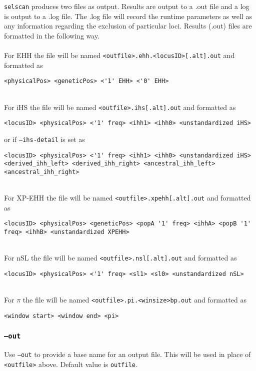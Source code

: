 \documentclass[12pt]{article}%
\begin{document}
{\tt selscan} produces two files as output.  Results are output to a .out file and a log is output to a .log file.  The .log file will record the runtime parameters as well as any information regarding the exclusion of particular loci.  Results (.out) files are formatted in the following way.
~\\~\\
For EHH the file will be named {\tt <outfile>.ehh.<locusID>[.alt].out} and formatted as
\begin{lstlisting}
<physicalPos> <geneticPos> <'1' EHH> <'0' EHH>
\end{lstlisting}
~\\
For iHS the file will be named {\tt <outfile>.ihs[.alt].out} and formatted as
\begin{lstlisting}
<locusID> <physicalPos> <'1' freq> <ihh1> <ihh0> <unstandardized iHS>
\end{lstlisting}
or if {\tt --ihs-detail} is set as
\begin{lstlisting}
<locusID> <physicalPos> <'1' freq> <ihh1> <ihh0> <unstandardized iHS> <derived_ihh_left> <derived_ihh_right> <ancestral_ihh_left> <ancestral_ihh_right>
\end{lstlisting}
~\\
For XP-EHH the file will be named {\tt <outfile>.xpehh[.alt].out} and formatted as
\begin{lstlisting}
<locusID> <physicalPos> <geneticPos> <popA '1' freq> <ihhA> <popB '1' freq> <ihhB> <unstandardized XPEHH>
\end{lstlisting}
~\\
For nSL the file will be named {\tt <outfile>.nsl[.alt].out} and formatted as
\begin{lstlisting}
<locusID> <physicalPos> <'1' freq> <sl1> <sl0> <unstandardized nSL>
\end{lstlisting}
~\\
For $\pi$ the file will be named {\tt <outfile>.pi.<winsize>bp.out} and formatted as
\begin{lstlisting}
<window start> <window end> <pi> 
\end{lstlisting}

\subsubsection{{\tt --out}}

Use {\tt --out} to provide a base name for an output file.  This will be used in place of {\tt <outfile>} above.  Default value is {\tt outfile}.  
\end{document}
